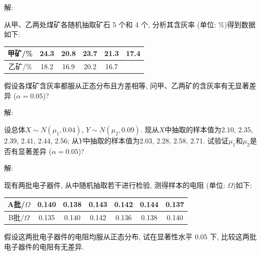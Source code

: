 \documentclass[standard]{ExBook}
\begin{document}
\begin{qitems}
    \begin{bbox}
解: 
    \end{bbox}

\vspace{-5em}

    \begin{bbox}
    \begin{shaded}
        \qitem
从甲、乙两处煤矿各随机抽取矿石 5 个和 4 个, 分析其含灰率 (单位: \%)得到数据如下:
\begin{center}
\setlength{\tabcolsep}{28pt}
\begin{tabular}{c|ccccc}
\hline
甲矿/\% & 24.3 & 20.8 & 23.7 & 21.3 & 17.4\\
\hline
乙矿/\% & 18.2 & 16.9 & 20.2 & 16.7 &  \\
\hline
\end{tabular}
\end{center}
假设各煤矿含灰率都服从正态分布且方差相等, 问甲、乙两矿的含灰率有无显著差异 ($\alpha=0.05$)?
    \end{shaded}
    \end{bbox}

\vspace{-5em}

    \begin{bbox}
解: 
    \end{bbox}

\vspace{-5em}

    \begin{bbox}
    \begin{shaded}
        \qitem
设总体$X \sim N(\mu_1,0.04)$, $Y \sim N(\mu_2,0.09)$. 现从$X$中抽取的样本值为2.10, 2.35, 2.39, 2.41, 2.44, 2.56; 从$Y$中抽取的样本值为2.03, 2.28, 2.58, 2.71. 试验证$\mu_1$和$\mu_2$是否有显著差异 ($\alpha=0.05$)?
    \end{shaded}
    \end{bbox}

\vspace{-5em}

    \begin{bbox}
解: 
    \end{bbox}

\vspace{-5em}

    \begin{bbox}
    \begin{shaded}
        \qitem
现有两批电子器件, 从中随机抽取若干进行检验, 测得样本的电阻 (单位: $\Omega$)如下:
\begin{center}
\setlength{\tabcolsep}{20pt}
\begin{tabular}{c|cccccc}
\hline
A批/$\Omega$ & 0.140 & 0.138 & 0.143 & 0.142 & 0.144 & 0.137 \\
\hline
B批/$\Omega$ & 0.135 & 0.140 & 0.142 & 0.136 & 0.138 & 0.140 \\
\hline
\end{tabular}
\end{center}
假设这两批电子器件的电阻均服从正态分布, 试在显著性水平 0.05 下, 比较这两批电子器件的电阻有无差异.
    \end{shaded}
    \end{bbox}


\end{qitems}
\end{document}
